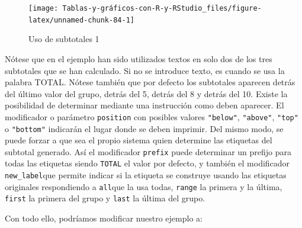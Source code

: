 \documentclass[
]{book}
\begin{document}
\begin{figure}[H]

{\centering \texttt{[image: Tablas-y-gráficos-con-R-y-RStudio\_files/figure-latex/unnamed-chunk-84-1]} 

}

\caption{Uso de subtotales 1}\label{fig:unnamed-chunk-84}
\end{figure}

Nótese que en el ejemplo han sido utilizados textos en solo dos de los tres subtotales que se han calculado. Si no se introduce texto, es cuando se usa la palabra TOTAL. Nótese también que por defecto los subtotales aparecen detrás del último valor del grupo, detrás del 5, detrás del 8 y detrás del 10. Existe la posibilidad de determinar mediante una instrucción como deben aparecer. El modificador o parámetro \texttt{position} con posibles valores \texttt{"below"}, \texttt{"above"}, \texttt{"top"} o \texttt{"bottom"} indicarán el lugar donde se deben imprimir. Del mismo modo, se puede forzar a que sea el propio sistema quien determine las etiquetas del subtotal generado. Así el modificador \texttt{prefix} puede determinar un prefijo para todas las etiquetas siendo \texttt{TOTAL} el valor por defecto, y también el modificador \texttt{new\_label}que permite indicar si la etiqueta se construye usando las etiquetas originales respondiendo a \texttt{all}que la usa todas, \texttt{range} la primera y la última, \texttt{first} la primera del grupo y \texttt{last} la última del grupo.

Con todo ello, podríamos modificar nuestro ejemplo a:
\end{document}

